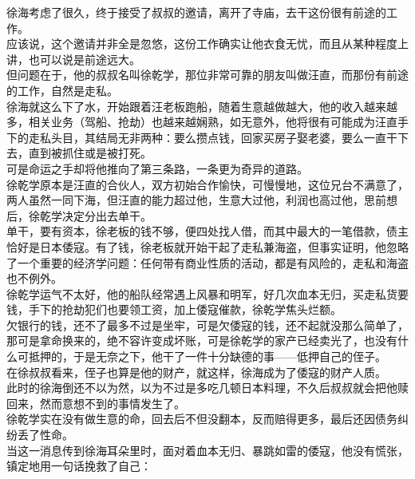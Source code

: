 \begin{multicols}{\theparacolNo}
徐海考虑了很久，终于接受了叔叔的邀请，离开了寺庙，去干这份很有前途的工作。\\

应该说，这个邀请并非全是忽悠，这份工作确实让他衣食无忧，而且从某种程度上讲，也可以说是前途远大。\\

但问题在于，他的叔叔名叫徐乾学，那位非常可靠的朋友叫做汪直，而那份有前途的工作，自然是走私。\\

徐海就这么下了水，开始跟着汪老板跑船，随着生意越做越大，他的收入越来越多，相关业务（驾船、抢劫）也越来越娴熟，如无意外，他将很有可能成为汪直手下的走私头目，其结局无非两种：要么攒点钱，回家买房子娶老婆，要么一直干下去，直到被抓住或是被打死。\\

可是命运之手却将他推向了第三条路，一条更为奇异的道路。\\

徐乾学原本是汪直的合伙人，双方初始合作愉快，可慢慢地，这位兄台不满意了，两人虽然一同下海，但汪直的能力超过他，生意大过他，利润也高过他，思前想后，徐乾学决定分出去单干。\\

单干，要有资本，徐老板的钱不够，便四处找人借，而其中最大的一笔借款，债主恰好是日本倭寇。有了钱，徐老板就开始干起了走私兼海盗，但事实证明，他忽略了一个重要的经济学问题：任何带有商业性质的活动，都是有风险的，走私和海盗也不例外。\\

徐乾学运气不太好，他的船队经常遇上风暴和明军，好几次血本无归，买走私货要钱，手下的抢劫犯们也要领工资，加上倭寇催款，徐乾学焦头烂额。\\

欠银行的钱，还不了最多不过是坐牢，可是欠倭寇的钱，还不起就没那么简单了，那可是拿命换来的，绝不容许变成坏账，可是徐乾学的家产已经卖光了，也没有什么可抵押的，于是无奈之下，他干了一件十分缺德的事——低押自己的侄子。\\

在徐叔叔看来，侄子也算是他的财产，就这样，徐海成为了倭寇的财产人质。\\

此时的徐海倒还不以为然，以为不过是多吃几顿日本料理，不久后叔叔就会把他赎回来，然而意想不到的事情发生了。\\

徐乾学实在没有做生意的命，回去后不但没翻本，反而赔得更多，最后还因债务纠纷丢了性命。\\

当这一消息传到徐海耳朵里时，面对着血本无归、暴跳如雷的倭寇，他没有慌张，镇定地用一句话挽救了自己：\\


\end{multicols}
